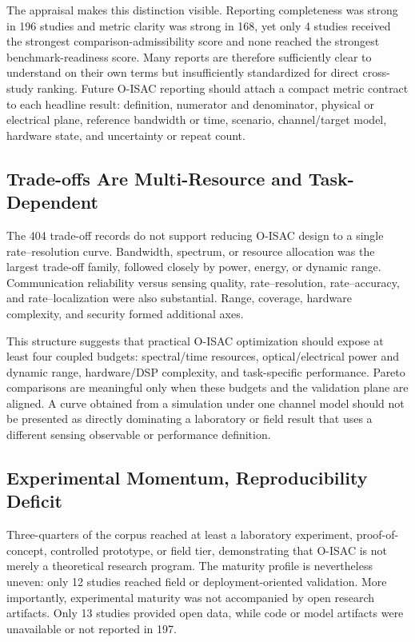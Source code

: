 The appraisal makes this distinction visible. Reporting completeness was
strong in 196 studies and metric clarity was strong in 168, yet only 4 studies
received the strongest comparison-admissibility score and none reached the
strongest benchmark-readiness score. Many reports are therefore sufficiently
clear to understand on their own terms but insufficiently standardized for
direct cross-study ranking. Future O-ISAC reporting should attach a compact
metric contract to each headline result: definition, numerator and
denominator, physical or electrical plane, reference bandwidth or time,
scenario, channel/target model, hardware state, and uncertainty or repeat
count.

\subsection{Trade-offs Are Multi-Resource and Task-Dependent}

The 404 trade-off records do not support reducing O-ISAC design to a single
rate--resolution curve. Bandwidth, spectrum, or resource allocation was the
largest trade-off family, followed closely by power, energy, or dynamic range.
Communication reliability versus sensing quality, rate--resolution,
rate--accuracy, and rate--localization were also substantial. Range, coverage,
hardware complexity, and security formed additional axes.

This structure suggests that practical O-ISAC optimization should expose at
least four coupled budgets: spectral/time resources, optical/electrical power
and dynamic range, hardware/DSP complexity, and task-specific performance.
Pareto comparisons are meaningful only when these budgets and the validation
plane are aligned. A curve obtained from a simulation under one channel model
should not be presented as directly dominating a laboratory or field result
that uses a different sensing observable or performance definition.

\subsection{Experimental Momentum, Reproducibility Deficit}

Three-quarters of the corpus reached at least a laboratory experiment,
proof-of-concept, controlled prototype, or field tier, demonstrating that
O-ISAC is not merely a theoretical research program. The maturity profile is
nevertheless uneven: only 12 studies reached field or deployment-oriented
validation. More importantly, experimental maturity was not accompanied by
open research artifacts. Only 13 studies provided open data, while code or
model artifacts were unavailable or not reported in 197.

